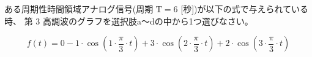 ある周期性時間領域アナログ信号(周期 $\textrm{T} = 6$ [秒])が以下の式で与えられている時、
第 3 高調波のグラフを選択肢a〜dの中から1つ選びなさい。

\[
f(t) = 
0
- 1 \cdot \cos \left ( 1 \cdot \frac{\pi}{3}  \cdot t \right )
+ 3 \cdot \cos \left ( 2 \cdot \frac{\pi}{3}  \cdot t \right )
+ 2 \cdot \cos \left ( 3 \cdot \frac{\pi}{3}  \cdot t \right )
\]

